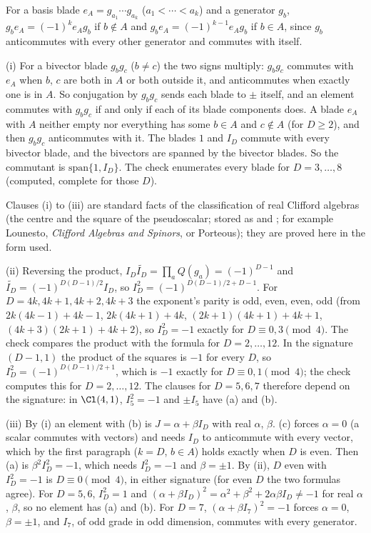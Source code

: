For a basis blade $e_A = g_{a_1}\cdots g_{a_k}$ ($a_1 < \cdots < a_k$) and a generator $g_b$, $g_be_A = (-1)^{k}e_Ag_b$ if $b \notin A$ and $g_be_A = (-1)^{k-1}e_Ag_b$ if $b \in A$, since $g_b$ anticommutes with every other generator and commutes with itself.

(i) For a bivector blade $g_bg_c$ ($b \ne c$) the two signs multiply: $g_bg_c$ commutes with $e_A$ when $b$, $c$ are both in $A$ or both outside it, and anticommutes when exactly one is in $A$. So conjugation by $g_bg_c$ sends each blade to $\pm$ itself, and an element commutes with $g_bg_c$ if and only if each of its blade components does. A blade $e_A$ with $A$ neither empty nor everything has some $b \in A$ and $c \notin A$ (for $D \ge 2$), and then $g_bg_c$ anticommutes with it. The blades $1$ and $I_D$ commute with every bivector blade, and the bivectors are spanned by the bivector blades. So the commutant is $\mathrm{span}\{1, I_D\}$. The check enumerates every blade for $D = 3, \ldots, 8$ (computed, complete for those $D$).

Clauses (i) to (iii) are standard facts of the classification of real Clifford algebras (the centre and the square of the pseudoscalar; stored as  and ; for example Lounesto, \emph{Clifford Algebras and Spinors}, or Porteous); they are proved here in the form used.

(ii) Reversing the product, $I_D\widetilde{I_D} = \prod_a Q(g_a) = (-1)^{D-1}$ and $\widetilde{I_D} = (-1)^{D(D-1)/2}I_D$, so $I_D^2 = (-1)^{D(D-1)/2 + D - 1}$. For $D = 4k, 4k+1, 4k+2, 4k+3$ the exponent's parity is odd, even, even, odd (from $2k(4k-1) + 4k - 1$, $2k(4k+1) + 4k$, $(2k+1)(4k+1) + 4k + 1$, $(4k+3)(2k+1) + 4k + 2$), so $I_D^2 = -1$ exactly for $D \equiv 0, 3 \pmod 4$. The check compares the product with the formula for $D = 2, \ldots, 12$. In the signature $(D-1, 1)$ the product of the squares is $-1$ for every $D$, so $I_D^2 = (-1)^{D(D-1)/2 + 1}$, which is $-1$ exactly for $D \equiv 0, 1 \pmod 4$; the check computes this for $D = 2, \ldots, 12$. The clauses for $D = 5, 6, 7$ therefore depend on the signature: in $\Cl(4, 1)$, $I_5^2 = -1$ and $\pm I_5$ have (a) and (b).

(iii) By (i) an element with (b) is $J = \alpha + \beta I_D$ with real $\alpha$, $\beta$. (c) forces $\alpha = 0$ (a scalar commutes with vectors) and needs $I_D$ to anticommute with every vector, which by the first paragraph ($k = D$, $b \in A$) holds exactly when $D$ is even. Then (a) is $\beta^2I_D^2 = -1$, which needs $I_D^2 = -1$ and $\beta = \pm 1$. By (ii), $D$ even with $I_D^2 = -1$ is $D \equiv 0 \pmod 4$, in either signature (for even $D$ the two formulas agree). For $D = 5, 6$, $I_D^2 = 1$ and $(\alpha + \beta I_D)^2 = \alpha^2 + \beta^2 + 2\alpha\beta I_D \ne -1$ for real $\alpha$, $\beta$, so no element has (a) and (b). For $D = 7$, $(\alpha + \beta I_7)^2 = -1$ forces $\alpha = 0$, $\beta = \pm 1$, and $I_7$, of odd grade in odd dimension, commutes with every generator.

